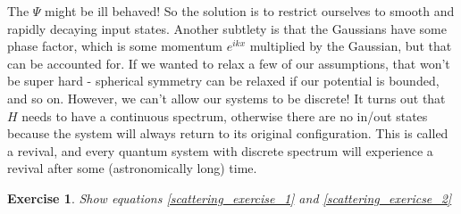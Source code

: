 \documentclass{article}
\newtheorem{exercise}{Exercise}[section]
\begin{document}
The $\Psi$ might be ill behaved! So the solution is to restrict ourselves to smooth and rapidly decaying input states. Another subtlety is that the Gaussians have some phase factor, which is some momentum $e^{ikx}$ multiplied by the Gaussian, but that can be accounted for. If we wanted to relax a few of our assumptions, that won't be super hard - spherical symmetry can be relaxed if our potential is bounded, and so on. However, we can't allow our systems to be discrete! It turns out that $H$ needs to have a continuous spectrum, otherwise there are no in/out states because the system will always return to its original configuration. This is called a revival, and every quantum system with discrete spectrum will experience a revival after some (astronomically long) time.
\begin{exercise} Show equations \eqref{scattering_exercise_1} and \eqref{scattering_exericse_2}\end{exercise}
\end{document}
